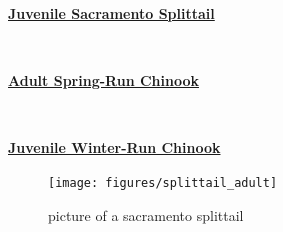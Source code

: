 \documentclass[
]{book}
\begin{document}
\begin{panel-grid}

\begin{columns-nocenter}

\begin{column800}

\textbf{\href{http://calfish.ucdavis.edu/species/?uid=136\&ds=698}{Juvenile Sacramento Splittail}}

\end{column800}

\begin{column40}

~

\end{column40}

\begin{column800}

\textbf{\href{http://calfish.ucdavis.edu/species/?uid=28\&ds=698}{Adult Spring-Run Chinook}}

\end{column800}

\begin{column40}

~

\end{column40}

\begin{column800}

\textbf{\href{http://calfish.ucdavis.edu/species/?uid=30\&ds=698}{Juvenile Winter-Run Chinook}}

\end{column800}

\end{columns-nocenter}

\begin{columns-nocenter}

\begin{column800}

\begin{figure}

{\centering \texttt{[image: figures/splittail\_adult]} 

}

\caption{picture of a sacramento splittail}\label{fig:unnamed-chunk-32}
\end{figure}

\end{column800}

\begin{column40}

~


\end{column40}
\end{columns-nocenter}
\end{panel-grid}
\end{document}
